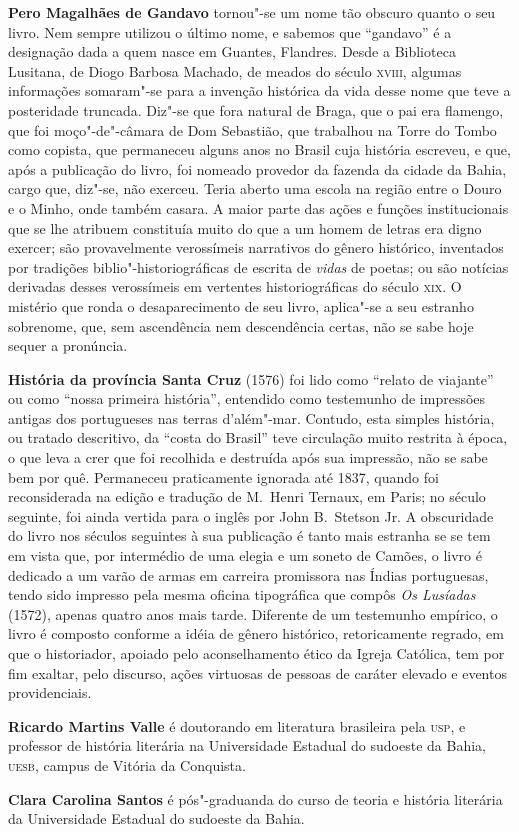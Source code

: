 
\textbf{Pero Magalhães de Gandavo} tornou"-se um nome tão
obscuro quanto o seu livro. Nem sempre utilizou o último nome, e sabemos que
``gandavo'' é a designação dada a quem nasce em Guantes, Flandres.  Desde a
Biblioteca Lusitana, de Diogo Barbosa Machado, de meados do século
\textsc{xviii}, algumas informações somaram"-se para a invenção histórica da
vida desse nome que teve a posteridade truncada. Diz"-se que fora natural de
Braga, que o pai era flamengo, que foi moço"-de"-câmara de Dom Sebastião, que
trabalhou na Torre do Tombo como copista, que permaneceu alguns anos no Brasil
cuja história escreveu, e que, após a publicação do livro, foi nomeado provedor
da fazenda da cidade da Bahia, cargo que, diz"-se, não exerceu. Teria aberto
uma escola na região entre o Douro e o Minho, onde também casara. A maior parte
das ações e funções institucionais que se lhe atribuem constituía muito do que a
um homem de letras era digno exercer; são provavelmente verossímeis narrativos
do gênero histórico, inventados por tradições biblio"-historiográficas de
escrita de \textit{vidas} de poetas; ou são notícias derivadas desses
verossímeis em vertentes historiográficas do século \textsc{xix}. O mistério que
ronda o desaparecimento de seu livro, aplica"-se a seu estranho sobrenome, que,
sem ascendência nem descendência certas, não se sabe hoje sequer a pronúncia.
       
\textbf{História da província Santa Cruz} (1576) foi lido como ``relato de
viajante'' ou como ``nossa primeira história'', entendido como testemunho de
impressões antigas dos portugueses nas terras d'além"-mar. Contudo, esta
simples história, ou tratado descritivo, da ``costa do Brasil'' teve circulação
muito restrita à época, o que leva a crer que foi recolhida e destruída após sua
impressão, não se sabe bem por quê. Permaneceu praticamente ignorada até 1837,
quando foi reconsiderada na edição e tradução de M.~Henri Ternaux, em Paris; no
século seguinte, foi ainda vertida para o inglês por John B.~Stetson Jr. A
obscuridade do livro nos séculos seguintes à sua publicação é tanto mais
estranha se se tem em vista que, por intermédio de uma elegia e um soneto de
Camões, o livro é dedicado a um varão de armas em carreira promissora nas Índias
portuguesas, tendo sido impresso pela mesma oficina tipográfica que compôs
\textit{Os Lusíadas} (1572), apenas quatro anos mais tarde. Diferente de um
testemunho empírico, o livro é composto conforme a idéia de gênero histórico,
retoricamente regrado, em que o historiador, apoiado pelo aconselhamento ético
da Igreja Católica, tem por fim exaltar, pelo discurso, ações virtuosas de
pessoas de caráter elevado e eventos providenciais. 

\textbf{Ricardo Martins Valle} é doutorando em literatura brasileira pela
\textsc{usp}, e professor de história literária na Universidade Estadual do
sudoeste da Bahia, \textsc{uesb}, campus de Vitória da Conquista.

\textbf{Clara Carolina Santos} é pós"-graduanda do curso de teoria e história
literária da Universidade Estadual do sudoeste da Bahia.  


